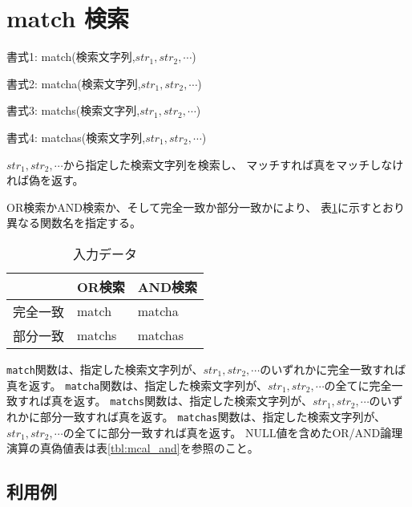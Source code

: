 
%

\section{match 検索\label{sect:match}}

書式1: match(検索文字列,$str_1,str_2,\cdots$)

書式2: matcha(検索文字列,$str_1,str_2,\cdots$)

書式3: matchs(検索文字列,$str_1,str_2,\cdots$)

書式4: matchas(検索文字列,$str_1,str_2,\cdots$)

$str_1,str_2,\cdots$から指定した検索文字列を検索し、
マッチすれば真をマッチしなければ偽を返す。

OR検索かAND検索か、そして完全一致か部分一致かにより、
表\ref{tbl:func_match_cond}に示すとおり異なる関数名を指定する。

\begin{table}[htbp]
\begin{center}
\caption{入力データ\label{tbl:func_match_cond}}
{\small
\begin{tabular}{l|ll}
\hline
& OR検索 & AND検索 \\
\hline
完全一致 & match  & matcha  \\
部分一致 & matchs & matchas \\
\hline
\end{tabular}
}
\end{center}
\end{table}

\verb|match|関数は、指定した検索文字列が、$str_1,str_2,\cdots$のいずれかに完全一致すれば真を返す。
\verb|matcha|関数は、指定した検索文字列が、$str_1,str_2,\cdots$の全てに完全一致すれば真を返す。
\verb|matchs|関数は、指定した検索文字列が、$str_1,str_2,\cdots$のいずれかに部分一致すれば真を返す。
\verb|matchas|関数は、指定した検索文字列が、$str_1,str_2,\cdots$の全てに部分一致すれば真を返す。
NULL値を含めたOR/AND論理演算の真偽値表は表\ref{tbl:mcal_and}を参照のこと。

\subsection*{利用例}


%

